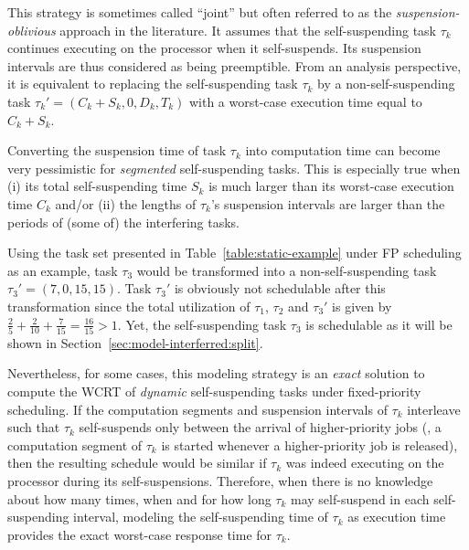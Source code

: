 \label{sec:model-interferred-oblivious}

This strategy is sometimes called ``joint'' \cite{bletsas:thesis} but often referred to as the \emph{suspension-oblivious} approach in the literature. It assumes that the self-suspending task $\tau_k$ continues executing on the processor when it self-suspends. Its suspension intervals are thus considered as being preemptible. From an analysis perspective, it is equivalent to replacing the self-suspending task $\tau_k$ by a non-self-suspending task $\tau_k' = (C_k + S_k, 0, D_k, T_k)$ with a worst-case execution time equal to $C_k + S_k$. 

Converting the suspension time of task $\tau_k$ into computation time can become very pessimistic for \emph{segmented} self-suspending tasks. This is especially true when (i) its total self-suspending time $S_k$ is much larger than its worst-case execution time $C_k$ and/or (ii) the lengths of $\tau_k$'s suspension intervals are larger than the periods of (some of) the interfering tasks. 

\begin{example}
\label{ex:suspension-as-comput}   
Using the task set presented in Table~\ref{table:static-example} under FP scheduling as an example, task $\tau_3$ would be transformed into a non-self-suspending task $\tau_3' = (7,0, 15, 15)$. Task $\tau_3'$ is obviously not schedulable after this transformation since the total utilization of $\tau_1$, $\tau_2$ and $\tau_3'$ is given by $\frac{2}{5} + \frac{2}{10} + \frac{7}{15} = \frac{16}{15} > 1$. Yet, the self-suspending task $\tau_3$ is schedulable as it will be shown in Section~\ref{sec:model-interferred:split}.
\hfill\myendproof  
\end{example}

Nevertheless, for some cases, this modeling strategy is an \emph{exact} solution to compute the WCRT of \emph{dynamic} self-suspending tasks under fixed-priority scheduling. If the computation segments and suspension intervals of $\tau_k$ interleave such that $\tau_k$ self-suspends only between the arrival of higher-priority jobs
(\ie,  a computation segment of $\tau_k$ is started whenever a higher-priority job is released), then the resulting schedule would be similar if $\tau_k$ was indeed executing on the processor during its self-suspensions. Therefore, when there is no knowledge about how many times, when and for how long $\tau_k$ may self-suspend in each 
self-suspending interval, modeling the self-suspending time of $\tau_k$ as execution time provides the exact worst-case response 
time for $\tau_k$. 

